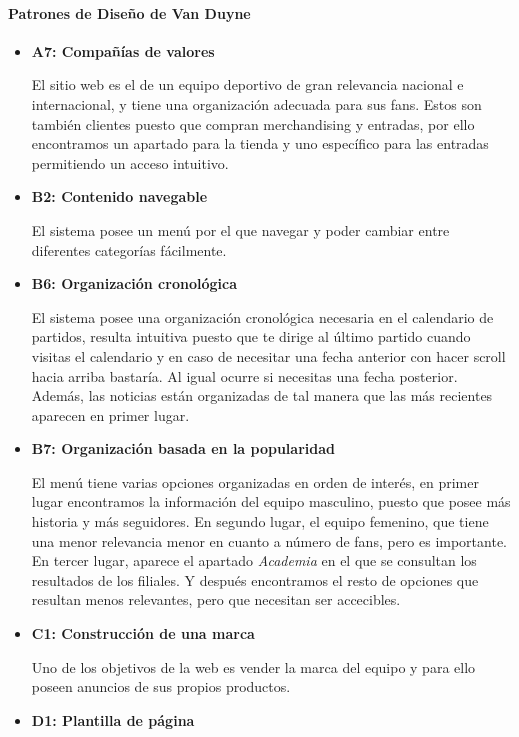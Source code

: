 \documentclass[10pt, spanish, pdftex]{template/UC3M_document}
\begin{document}
\paragraph{Patrones de Diseño de Van Duyne}
\begin{itemize}
  \item \textbf{A7: Compañías de valores}

  El sitio web es el de un equipo deportivo de gran relevancia nacional e internacional, y tiene una organización adecuada para sus fans. Estos son también clientes puesto que compran merchandising y entradas, por ello encontramos un apartado para la tienda y uno específico para las entradas permitiendo un acceso intuitivo.

  \item \textbf{B2: Contenido navegable}

  El sistema posee un menú por el que navegar y poder cambiar entre diferentes categorías fácilmente.

  \item \textbf{B6: Organización cronológica}

  El sistema posee una organización cronológica necesaria en el calendario de partidos, resulta intuitiva puesto que te dirige al último partido cuando visitas el calendario y en caso de necesitar una fecha anterior con hacer scroll hacia arriba bastaría. Al igual ocurre si necesitas una fecha posterior. Además, las noticias están organizadas de tal manera que las más recientes aparecen en primer lugar.

  \item \textbf{B7: Organización basada en la popularidad}

  El menú tiene varias opciones organizadas en orden de interés, en primer lugar encontramos la información del equipo masculino, puesto que posee más historia y más seguidores. En segundo lugar, el equipo femenino, que tiene una menor relevancia menor en cuanto a número de fans, pero es importante. En tercer lugar, aparece el apartado \textit{Academia} en el que se consultan los resultados de los filiales. Y después encontramos el resto de opciones que resultan menos relevantes, pero que necesitan ser accecibles.

  \item \textbf{C1: Construcción de una marca}

  Uno de los objetivos de la web es vender la marca del equipo y para ello poseen anuncios de sus propios productos.

  \item \textbf{D1: Plantilla de página}


\end{itemize}
\end{document}
